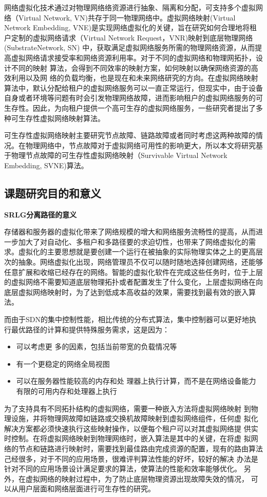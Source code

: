 网络虚拟化\cite{chowdhury2009network}技术通过对物理网络络资源进行抽象、隔离和分配，可支持多个虚拟网络（Virtual Network, VN)共存于同一物理网络中。虚拟网络映射\cite{fischer2013virtual}(Virtual Network Embedding, VNE)是实现网络虚拟化的关键，旨在研究如何合理地将租户定制的虚拟网络请求（Virtual Network Request，VNR)映射到底层物理网络 (SubstrateNetwork, SN) 中，获取满足虚拟网络服务所需的物理网络资源，从而提高虚拟网络请求接受率和网络资源利用率。对于不同的虚拟网络和物理网拓扑，设计不同的映射
算法，会得到不同效率的映射方案，如何映射以确保网络资源的高效利用以及网
络的负载均衡，也是现在和未来网络研究的方向。在虚拟网络映射算法中，默认分配给租户的虚拟网络服务可以一直正常运行，但现实中，由于设备自身或者环境等问题有时会引发物理网络故障，进而影响租户的虚拟网络服务的可生存性。因此，为向租户提供一个高可生存的虚拟网络服务，一些研究者提出了多种可生存性虚拟网络映射算法\cite{herker2013survey}。

可生存性虚拟网络映射主要研究节点故障、链路故障或者同时考虑这两种故障的情况。在物理网络中，节点故障对于虚拟网络可用性的影响更大，所以本文将研究基于物理节点故障的可生存性虚拟网络映射（Survivable Virtual Network Embedding, SVNE)算法。


\subsection{课题研究目的和意义}
\textbf{SRLG分离路径的意义}

存储器和服务器的虚拟化带来了网络规模的增大和网络服务流畅性的提高，从而进一步加大了对自动化、多租户和多路径要的求迫切性，也带来了网络虚拟化的需求。虚拟化的主要思想就是要创建一个运行在被抽象的实际物理实体之上的更高层次的抽象。网络虚拟化出现，网络管理员不仅可以随时随地选择创建网络，还能够任意扩展和收缩已经存在的网络。智能的虚拟化软件在完成这些任务时，位于上层的虚拟网络不需要知道底层物理拓扑或者配置发生了什么变化，上层虚拟网络在向底层虚拟网络映射时，为了达到低成本高收益的效果，需要找到最有效的嵌入算法。

而由于SDN的集中控制性能，相比传统的分布式算法，集中控制器可以更好地执行最优路径的计算和提供特殊服务需求，这是因为：
\begin{itemize}
  \item 可以考虑更 多的因素，包括当前带宽的负载情况等
  \item 有一个更稳定的网络全局视图
  \item 可以在服务器性能较高的内存和处 理器上执行计算，而不是在网络设备能力有限的可用内存和处理器上执行
\end{itemize}


为了支持具有不同拓扑结构的虚拟网络，需要一种嵌入方法将虚拟网络映射 到物理设施，并将物理网故障如链路或交换机故障映射到虚拟网络组件，任何虚 拟化解决方案都必须快速执行这些映射操作，以便每个租户可以对其虚拟网络提 供实时控制。在将虚拟网络映射到物理网络时，嵌入算法是其中的关键，在将虚 拟网络的节点和链路进行映射时，需要找到最佳路由完成资源的配置，现有的路由算法己经很多，对于不同的应用场景，很难评判算法性能的好坏，较好的解决 办法是针对不同的应用场景设计满足要求的算法，使算法的性能和效率能够优化。 另外，在虚拟网络的映射过程中，为了防止底层物理资源出现故障失效的情况， 可以从用户层面和网络层面进行可生存性的研究。


